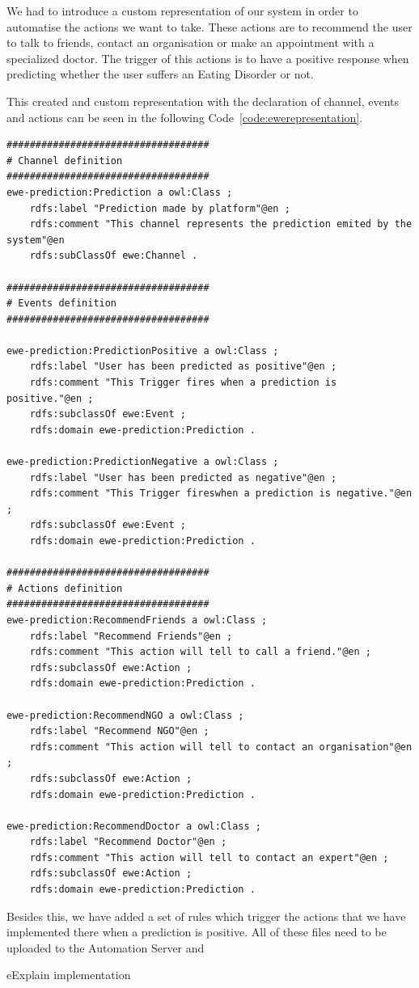 
We had to introduce a custom representation of our system in order to automatise the actions we want to take. These actions are to recommend the user to talk to friends, contact an organisation or make an appointment with a specialized doctor. The trigger of this actions is to have a positive response when predicting whether the user suffers an Eating Disorder or not.


This created and custom representation with the declaration of channel, events and actions can be seen in the following Code~\ref{code:ewerepresentation}.

\begin{lstlisting}[label={code:ewerepresentation}, caption={Custom semantic representation implemented}]
###################################
# Channel definition
###################################
ewe-prediction:Prediction a owl:Class ;    
    rdfs:label "Prediction made by platform"@en ;
    rdfs:comment "This channel represents the prediction emited by the system"@en
    rdfs:subClassOf ewe:Channel .

###################################
# Events definition
###################################

ewe-prediction:PredictionPositive a owl:Class ;
    rdfs:label "User has been predicted as positive"@en ;
    rdfs:comment "This Trigger fires when a prediction is positive."@en ;
    rdfs:subclassOf ewe:Event ;
    rdfs:domain ewe-prediction:Prediction .

ewe-prediction:PredictionNegative a owl:Class ;
    rdfs:label "User has been predicted as negative"@en ;
    rdfs:comment "This Trigger fireswhen a prediction is negative."@en ;
    rdfs:subclassOf ewe:Event ;
    rdfs:domain ewe-prediction:Prediction .

###################################
# Actions definition
###################################
ewe-prediction:RecommendFriends a owl:Class ;
    rdfs:label "Recommend Friends"@en ;
    rdfs:comment "This action will tell to call a friend."@en ;
    rdfs:subclassOf ewe:Action ;
    rdfs:domain ewe-prediction:Prediction .

ewe-prediction:RecommendNGO a owl:Class ;
    rdfs:label "Recommend NGO"@en ;
    rdfs:comment "This action will tell to contact an organisation"@en ;
    rdfs:subclassOf ewe:Action ;
    rdfs:domain ewe-prediction:Prediction .

ewe-prediction:RecommendDoctor a owl:Class ;
    rdfs:label "Recommend Doctor"@en ;
    rdfs:comment "This action will tell to contact an expert"@en ;
    rdfs:subclassOf ewe:Action ;
    rdfs:domain ewe-prediction:Prediction .

\end{lstlisting}

Besides this, we have added a set of rules which trigger the actions that we have implemented there when a prediction is positive. All of these files need to be uploaded to the Automation Server and

\todo eExplain implementation